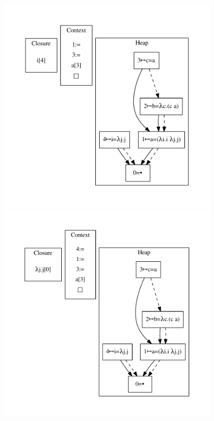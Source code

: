 \begin{figure}
\includegraphics[width=\linewidth/3]{figures/14.pdf}
\includegraphics[width=\linewidth/3]{figures/15.pdf}

\end{figure}
